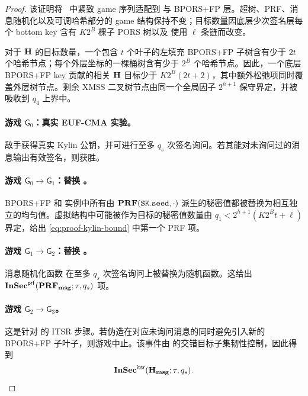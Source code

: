 \begin{proof}
该证明将~\cite{AC:HulKud22} 中紧致 \SPHINCSP game 序列适配到 \WOTSCS 与 BPORS+FP 层。超树、PRF、消息随机化以及可调哈希部分的 game 结构保持不变；目标数量因底层少次签名层每个 bottom key 含有 $K2^B$ 棵子 PORS 树以及 \WOTSCS 使用 $\ell$ 条链而改变。

对于 $\mathbf{H}$ 的目标数量，一个包含 $t$ 个叶子的左填充 BPORS+FP 子树含有少于 $2t$ 个哈希节点；每个外层坐标的一棵桶树含有少于 $2^B$ 个哈希节点。因此，一个底层 BPORS+FP key 贡献的相关 $\mathbf{H}$ 目标少于 $K2^B(2t+2)$，其中额外松弛项同时覆盖外层树节点。剩余 XMSS 二叉树节点由同一个全局因子 $2^{h+1}$ 保守界定，并被吸收到 $q_4$ 上界中。

\paragraph{游戏 $\mathsf{G}_0$：真实 EUF-CMA 实验。}
敌手获得真实 Kylin 公钥，并可进行至多 $q_s$ 次签名询问。若其能对未询问过的消息输出有效签名，则获胜。

\paragraph{游戏 $\mathsf{G}_0\to\mathsf{G}_1$：替换 \PRF。}
BPORS+FP 和 \WOTSCS 实例中所有由 $\PRF(\sk.\seed,\cdot)$ 派生的秘密值都被替换为相互独立的均匀值。虚拟结构中可能被作为目标的秘密值数量由
$q_1<2^{h+1}(K2^Bt+\ell)$ 界定，给出 \cref{eq:proof-kylin-bound} 中第一个 PRF 项。

\paragraph{游戏 $\mathsf{G}_1\to\mathsf{G}_2$：替换 \PRFmsg。}
消息随机化函数 \PRFmsg 在至多 $q_s$ 次签名询问上被替换为随机函数。这给出
$\mathbf{InSec}^{\mathsf{prf}}(\mathbf{PRF_{msg}};\tau,q_s)$ 项。

\paragraph{游戏 $\mathsf{G}_2\to\mathsf{G}_3$。}
这是针对 \hashmsg 的 ITSR 步骤。若伪造在对应未询问消息的同时避免引入新的 BPORS+FP 子叶子，则游戏中止。该事件由 \hashmsg 的交错目标子集韧性控制，因此得到
\[
    \mathbf{InSec}^{\mathsf{itsr}}(\mathbf{H_{msg}};\tau,q_s).
\]


\end{proof}
